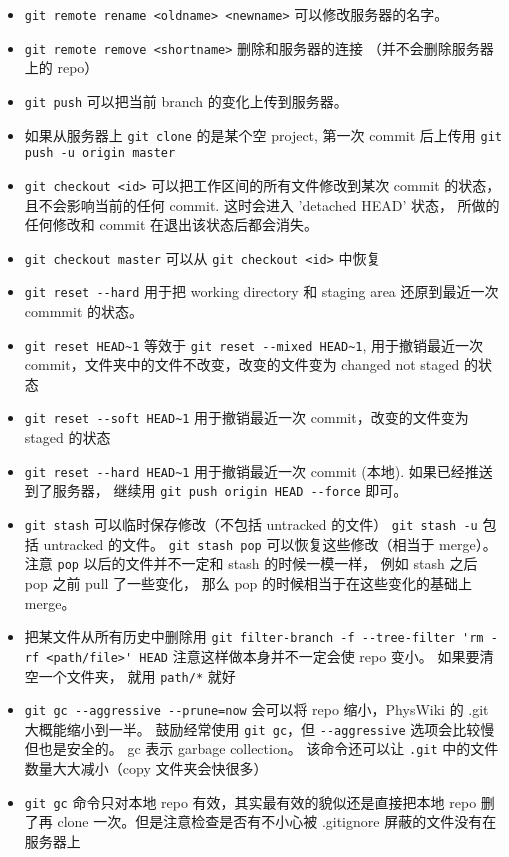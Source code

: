 \begin{itemize}
\item \verb|git remote rename <oldname> <newname>| 可以修改服务器的名字。
\item \verb|git remote remove <shortname>| 删除和服务器的连接 （并不会删除服务器上的 repo）
\item \verb|git push| 可以把当前 branch 的变化上传到服务器。
\item 如果从服务器上 \verb|git clone| 的是某个空 project, 第一次 commit 后上传用 \verb|git push -u origin master|
\item \verb|git checkout <id>| 可以把工作区间的所有文件修改到某次 commit 的状态， 且不会影响当前的任何 commit. 这时会进入 'detached HEAD' 状态， 所做的任何修改和 commit 在退出该状态后都会消失。
\item \verb|git checkout master| 可以从 \verb|git checkout <id>| 中恢复
\item \verb|git reset --hard| 用于把 working directory 和 staging area 还原到最近一次 commmit 的状态。
\item \verb|git reset HEAD~1| 等效于 \verb|git reset --mixed HEAD~1|, 用于撤销最近一次 commit，文件夹中的文件不改变，改变的文件变为 changed not staged 的状态
\item \verb|git reset --soft HEAD~1| 用于撤销最近一次 commit，改变的文件变为 staged 的状态
\item \verb|git reset --hard HEAD~1| 用于撤销最近一次 commit (本地). 如果已经推送到了服务器， 继续用 \verb|git push origin HEAD --force| 即可。
\item \verb|git stash| 可以临时保存修改（不包括 untracked 的文件） \verb|git stash -u| 包括 untracked 的文件。 \verb|git stash pop| 可以恢复这些修改（相当于 merge）。 注意 \verb|pop| 以后的文件并不一定和 stash 的时候一模一样， 例如 stash 之后 pop 之前 pull 了一些变化， 那么 pop 的时候相当于在这些变化的基础上 merge。
\item 把某文件从所有历史中删除用 \verb|git filter-branch -f --tree-filter 'rm -rf <path/file>' HEAD| 注意这样做本身并不一定会使 repo 变小。 如果要清空一个文件夹， 就用 \verb|path/*| 就好
\item \verb|git gc --aggressive --prune=now| 会可以将 repo 缩小，PhysWiki 的 .git 大概能缩小到一半。 鼓励经常使用 \verb|git gc|，但 \verb|--aggressive| 选项会比较慢但也是安全的。 gc 表示 garbage collection。 该命令还可以让 \verb|.git| 中的文件数量大大减小（copy 文件夹会快很多）
\item \verb|git gc| 命令只对本地 repo 有效，其实最有效的貌似还是直接把本地 repo 删了再 clone 一次。但是注意检查是否有不小心被 .gitignore 屏蔽的文件没有在服务器上

\end{itemize}

